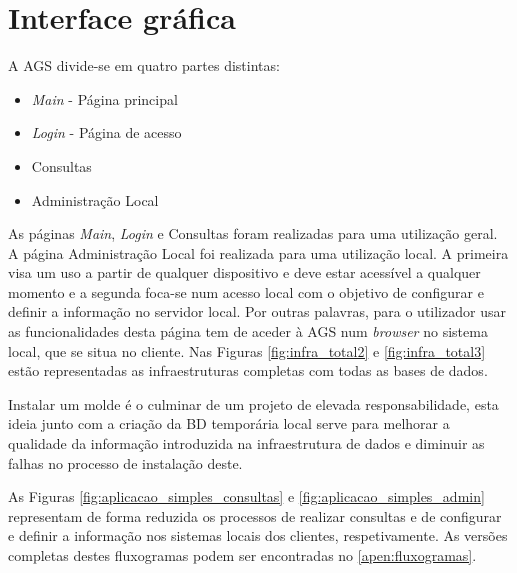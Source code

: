 \documentclass[11pt,twoside,a4paper]{report}
\begin{document}
\section{Interface gráfica}
A AGS divide-se em quatro partes distintas:
\begin{itemize}[noitemsep]
	\item \textit{Main} - Página principal
	\item \textit{Login} - Página de acesso
	\item Consultas
	\item Administração Local
\end{itemize}
As páginas \textit{Main}, \textit{Login} e Consultas foram realizadas para uma utilização geral. A página Administração Local foi realizada para uma utilização local. A primeira visa um uso a partir de qualquer dispositivo e deve estar acessível a qualquer momento e a segunda foca-se num acesso local com o objetivo de configurar e definir a informação no servidor local. Por outras palavras, para o utilizador usar as funcionalidades desta página tem de aceder à AGS num \textit{browser} no sistema local, que se situa no cliente. Nas Figuras \ref{fig:infra_total2} e \ref{fig:infra_total3} estão representadas as infraestruturas completas com todas as bases de dados.\par 
Instalar um molde é o culminar de um projeto de elevada responsabilidade, esta ideia junto com a criação da BD temporária local serve para melhorar a qualidade da informação introduzida na infraestrutura de dados e diminuir as falhas no processo de instalação deste.\par
As Figuras \ref{fig:aplicacao_simples_consultas} e \ref{fig:aplicacao_simples_admin} representam de forma reduzida os processos de realizar consultas e de configurar e definir a informação nos sistemas locais dos clientes, respetivamente. As versões completas destes fluxogramas podem ser encontradas no \autoref{apen:fluxogramas}.\par
\end{document}
